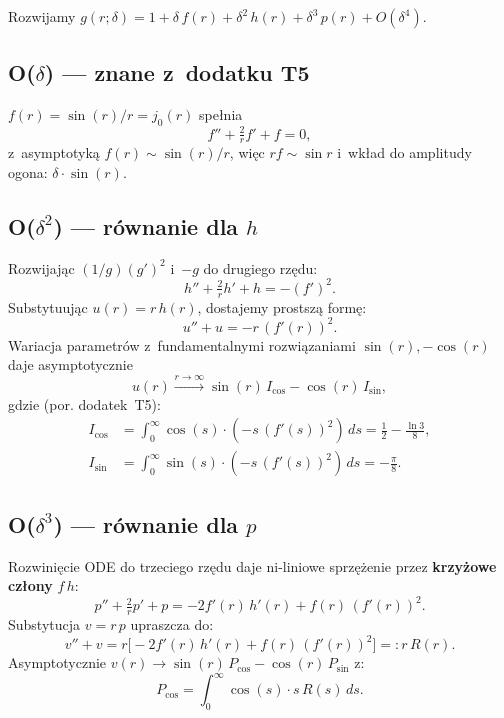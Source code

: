 Rozwijamy $g(r; \delta) = 1 + \delta\,f(r) + \delta^2\,h(r) + \delta^3\,p(r) + O(\delta^4)$.

\subsection*{O($\delta$) --- znane z~dodatku T5}

$f(r) = \sin(r)/r = j_0(r)$ spe\l{}nia
\begin{equation}
  f'' + \tfrac{2}{r}f' + f = 0,
\end{equation}
z~asymptotyk\k{a} $f(r) \sim \sin(r)/r$, wi\k{e}c $rf \sim \sin r$ i~wk\l{}ad do
amplitudy ogona: $\delta\cdot\sin(r)$.

\subsection*{O($\delta^2$) --- r\'ownanie dla $h$}

Rozwijaj\k{a}c $(1/g)(g')^2$ i~$-g$ do drugiego rz\k{e}du:
\begin{equation}
  h'' + \tfrac{2}{r}h' + h = -(f')^2.
  \label{eq:T6-ODE-h}
\end{equation}
Substytuuj\k{a}c $u(r) = r\,h(r)$, dostajemy prostsz\k{a} form\k{e}:
\begin{equation}
  u'' + u = -r\,(f'(r))^2.
  \label{eq:T6-u-eq}
\end{equation}
Wariacja parametr\'ow z~fundamentalnymi rozwi\k{a}zaniami $\sin(r), -\cos(r)$
daje asymptotycznie
\begin{equation}
  u(r) \xrightarrow{r \to \infty} \sin(r)\,I_{\cos} - \cos(r)\,I_{\sin},
\end{equation}
gdzie (por. dodatek~T5):
\begin{align}
  I_{\cos} &= \int_0^{\infty}\cos(s)\cdot(-s\,(f'(s))^2)\,ds = \tfrac{1}{2} - \tfrac{\ln 3}{8}, \\
  I_{\sin} &= \int_0^{\infty}\sin(s)\cdot(-s\,(f'(s))^2)\,ds = -\tfrac{\pi}{8}.
\end{align}

\subsection*{O($\delta^3$) --- r\'ownanie dla $p$}

Rozwini\k{e}cie ODE do trzeciego rz\k{e}du daje ni-liniowe sprz\k{e}\.zenie
przez \textbf{krzy\.zowe cz\l{}ony} $f\,h$:
\begin{equation}
  p'' + \tfrac{2}{r}p' + p = -2 f'(r)\,h'(r) + f(r)\,(f'(r))^2.
  \label{eq:T6-ODE-p}
\end{equation}
Substytucja $v = r\,p$ upraszcza do:
\begin{equation}
  v'' + v = r\big[-2 f'(r)\,h'(r) + f(r)\,(f'(r))^2\big] =: r\,R(r).
\end{equation}
Asymptotycznie $v(r) \to \sin(r)\,P_{\cos} - \cos(r)\,P_{\sin}$ z:
\begin{equation}
  P_{\cos} = \int_0^{\infty} \cos(s)\cdot s\,R(s)\,ds.
  \label{eq:T6-Pcos-def}
\end{equation}

